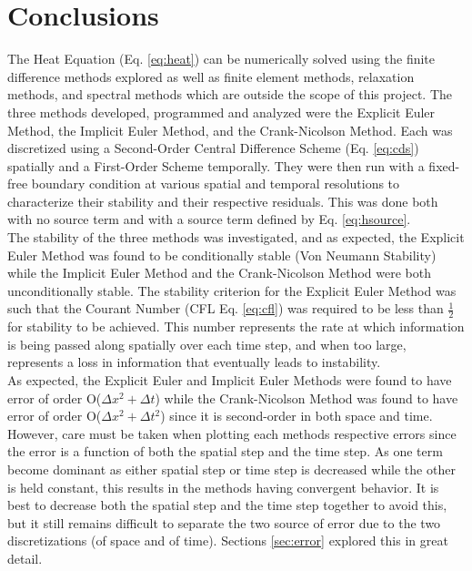 \documentclass[10pt, letter, showtrims]{extarticle}
\begin{document}
		\section{Conclusions}
		\noindent
		The Heat Equation (Eq. \ref{eq:heat}) can be numerically solved using the finite difference methods explored as well as finite element methods, relaxation methods, and spectral methods which are outside the scope of this project. The three methods developed, programmed and analyzed were the Explicit Euler Method, the Implicit Euler Method, and the Crank-Nicolson Method. Each was discretized using a Second-Order Central Difference Scheme (Eq. \ref{eq:cds}) spatially and a First-Order Scheme temporally. They were then run with a fixed-free boundary condition at various spatial and temporal resolutions to characterize their stability and their respective residuals. This was done both with no source term and with a source term defined by Eq. \ref{eq:hsource}. \\

		\noindent		
		The stability of the three methods was investigated, and as expected, the Explicit Euler Method was found to be conditionally stable (Von Neumann Stability) while the Implicit Euler Method and the Crank-Nicolson Method were both unconditionally stable. The stability criterion for the Explicit Euler Method was such that the Courant Number (CFL Eq. \ref{eq:cfl}) was required to be less than $\frac{1}{2}$ for stability to be achieved. This number represents the rate at which information is being passed along spatially over each time step, and when too large, represents a loss in information that eventually leads to instability. \\
		
		\noindent
		As expected, the Explicit Euler and Implicit Euler Methods were found to have error of order O($\Delta x^{2} + \Delta t$) while the Crank-Nicolson Method was found to have error of order O($\Delta x^{2} + \Delta t^{2}$) since it is second-order in both space and time. However, care must be taken when plotting each methods respective errors since the error is a function of both the spatial step and the time step. As one term become dominant as either spatial step or time step is decreased while the other is held constant, this results in the methods having convergent behavior. It is best to decrease both the spatial step and the time step together to avoid this, but it still remains difficult to separate the two source of error due to the two discretizations (of space and of time). Sections \ref{sec:error} explored this in great detail. \\
		
\end{document}
